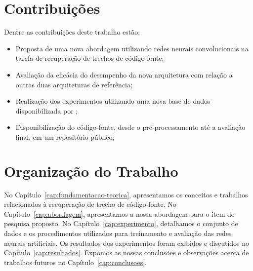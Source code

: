 \section{Contribuições}
\label{sec:contribucoes}

Dentre as contribuições deste trabalho estão:

\begin{itemize}
\item Proposta de uma nova abordagem utilizando redes neurais convolucionais na tarefa de recuperação de trechos de código-fonte;
\item Avaliação da eficácia do desempenho da nova arquitetura com relação a outras duas arquiteturas de referência;
\item Realização dos experimentos utilizando uma nova base de dados disponibilizada por \cite{yao-2018};
\item Disponibilização do código-fonte, desde o pré-processamento até a avaliação final, em um repositório público;
\end{itemize}

\section{Organização do Trabalho}
\label{sec:organizacao_trabalho}

No Capítulo~\ref{cap:fundamentacao-teorica}, apresentamos os conceitos e trabalhos relacionados à recuperação de trecho de código-fonte. No Capítulo~\ref{cap:abordagem}, apresentamos a nossa abordagem para o item de pesquisa proposto. No Capítulo~\ref{cap:experimento}, detalhamos o conjunto de dados e os procedimentos utilizados para treinamento e avaliação das redes neurais artificiais. Os resultados dos experimentos foram exibidos e discutidos no Capítulo~\ref{cap:resultados}. Expomos as nossas conclusões e observações acerca de trabalhos futuros no Capítulo~\ref{cap:conclusoes}.